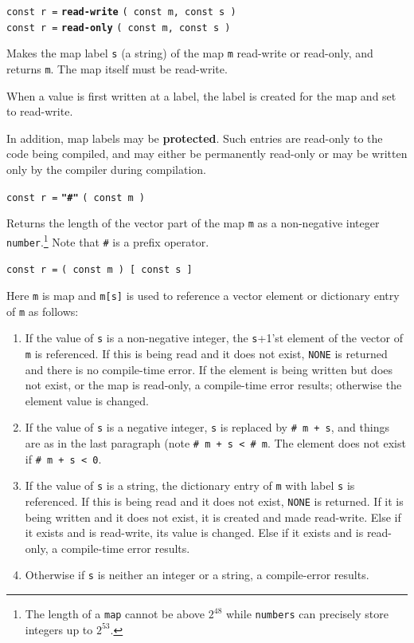 \documentclass[12pt]{article}
\newcommand{\key}[1]{{\rm \bfseries #1}}
\newcommand{\ttkey}[1]{{\tt \bfseries #1}}
\newenvironment{indpar}[1][0.3in]%
	{\begin{list}{}%
		     {\setlength{\itemsep}{0in}%
		      \setlength{\topsep}{0in}%
		      \setlength{\parsep}{1ex}%
		      \setlength{\labelwidth}{#1}%
		      \setlength{\leftmargin}{#1}%
		      \addtolength{\leftmargin}{\labelsep}}%
	 \item}%
	{\end{list}}
\begin{document}
{\tt const r =} \ttkey{read-write} {\tt ( const m, const s )} \\
{\tt const r =} \ttkey{read-only} {\tt ( const m, const s )} %
\label{READ-ONLY-DICTIONARY-FUNCTION}
\begin{indpar}
Makes the map label {\tt s} (a string) of the map {\tt m}
read-write or read-only, and returns {\tt m}.  The map
itself must be read-write.

When a value is first written at a label, the label is created
for the map and set to read-write.

In addition, map labels may be \key{protected}.  Such entries
are read-only to the code being compiled, and may either be
permanently read-only or may be written only by the compiler
during compilation.
\end{indpar}

{\tt const r =} \ttkey{"\#"} {\tt ( const m )}
\begin{indpar}
Returns the length of the vector part of the map {\tt m}
as a non-negative integer
{\tt number}.\footnote{The length of a {\tt map} cannot
be above $2^{48}$ while
{\tt numbers} can precisely store integers up to $2^{53}$.}
Note that {\tt \#} is a prefix operator.
\end{indpar}


{\tt const r =} {\tt ( const m ) [ const s ]}
\begin{indpar}
Here {\tt m} is map and {\tt m[s]} is used to reference a
vector element or dictionary entry of {\tt m} as follows:
\begin{enumerate}
\item If the value of {\tt s} is a non-negative integer,
the {\tt s}+1'st element
of the vector of {\tt m} is referenced.  If this is being read and
it does not exist, {\tt NONE} is returned and there is no compile-time
error.
If the element is being written but does not exist, or the map
is read-only, a compile-time error results; otherwise the element
value is changed.
\item If the value of {\tt s} is a negative integer,
{\tt s} is replaced by {\tt \# m + s}, and things
are as in the last paragraph (note {\tt \# m + s < \# m}.  The element
does not exist if {\tt \# m + s < 0}.
\item If the value of {\tt s} is a string, the dictionary entry
of {\tt m} with label {\tt s} is referenced.  If this is being read and
it does not exist, {\tt NONE} is returned.  If it is being written and
it does not exist, it is created and made read-write.
Else if it exists and is read-write, its value is changed.
Else if it exists and is read-only, a compile-time error results.
\item Otherwise if {\tt s} is neither an integer or a string,
a compile-error results.
\end{enumerate}
\end{indpar}
\end{document}

